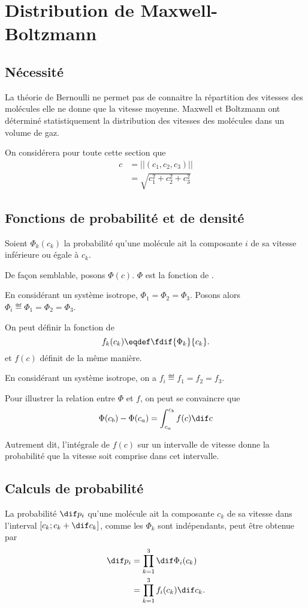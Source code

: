 \section{Distribution de Maxwell-Boltzmann}
\subsection{Nécessité}
La théorie de Bernoulli ne permet pas de connaitre la répartition des vitesses
des molécules elle ne donne que la vitesse moyenne.
Maxwell et Boltzmann ont déterminé statistiquement la distribution
des vitesses des molécules dans un volume de gaz.

On considérera pour toute cette section que
\begin{align}
  c & = ||(c_1, c_2, c_3)||\label{eq:cci}\\
  & = \sqrt{c_1^2 + c_2^2 + c_3^2}\nonumber
\end{align}

\subsection{Fonctions de probabilité et de densité}
Soient $\Phi_k(c_k)$ la probabilité qu'une molécule ait la composante $i$
de sa vitesse inférieure ou égale à $c_k$.

De façon semblable, posons $\Phi(c)$.
$\Phi$ est la fonction de .

En considérant un système isotrope,
$\Phi_1 = \Phi_2 = \Phi_3$.
Posons alors $\Phi_i \eqdef \Phi_1 = \Phi_2 = \Phi_3$.

On peut définir la fonction de 
\[ f_k(c_k) \eqdef \fdif{\Phi_k}{c_k}. \]
et $f(c)$ définit de la même manière.

En considérant un système isotrope,
on a $f_i \eqdef f_1 = f_2 = f_3$.

Pour illustrer la relation entre $\Phi$ et $f$, on peut se convaincre que
\[ \Phi(c_b) - \Phi(c_a) = \int_{c_a}^{c_b} f(c) \dif c \]

Autrement dit, l'intégrale de $f(c)$ sur un intervalle de vitesse donne
la probabilité que la vitesse soit comprise dans cet intervalle.

\subsection{Calculs de probabilité}
La probabilité $\dif p_i$ qu'une molécule ait
la composante $c_k$ de sa vitesse dans l'interval $[c_k; c_k + \dif c_k]$,
comme les $\Phi_k$ sont indépendants, peut être obtenue par
\begin{align*}
  \dif p_i & = \prod_{k=1}^3 \dif\Phi_i(c_k)\\
  & = \prod_{k=1}^3 f_i(c_k) \dif c_k.
\end{align*}

